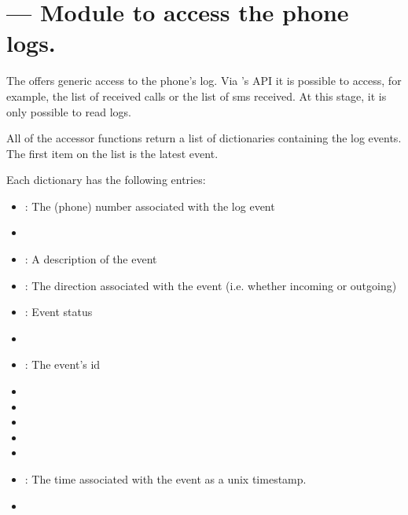 %
%
%

\section{ ---
  Module to access the phone logs.}
\label{sec:logs}


The  offers generic access to the phone's log. Via 's API
it is possible to access, for example, the list of received calls or the list of sms received.
At this stage, it is only possible to read logs.

All of the accessor functions return a list of dictionaries containing
the log events. The first item on the list is the latest event.

Each dictionary has the following entries:
\begin{itemize}
\item {}: The (phone) number associated with the log event
\item {}
\item {}: A description of the event
\item {}: The direction associated with the event (i.e. whether incoming or outgoing)
\item {}: Event status
\item {}
\item {}: The event's id
\item {}
\item {}
\item {}
\item {}
\item {}
\item {}: The time associated with the event as a unix timestamp.
\item {}
\end{itemize}

